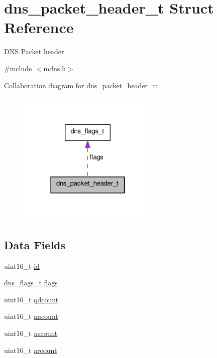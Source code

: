 \hypertarget{structdns__packet__header__t}{\section{dns\-\_\-packet\-\_\-header\-\_\-t Struct Reference}
\label{structdns__packet__header__t}
}


D\-N\-S Packet header.  




{\ttfamily \#include $<$mdns.\-h$>$}



Collaboration diagram for dns\-\_\-packet\-\_\-header\-\_\-t\-:\nopagebreak
\begin{figure}[H]
\begin{center}
\leavevmode
\includegraphics[width=190pt]{structdns__packet__header__t__coll__graph}
\end{center}
\end{figure}
\subsection*{Data Fields}
\begin{DoxyCompactItemize}
\item 
uint16\-\_\-t \hyperlink{structdns__packet__header__t_a4fc3a0c58dfbd1e68224521185cb9384}{id}
\item 
\hyperlink{structdns__flags__t}{dns\-\_\-flags\-\_\-t} \hyperlink{structdns__packet__header__t_a17537773eff778e034c52ba8bc8c2691}{flags}
\item 
uint16\-\_\-t \hyperlink{structdns__packet__header__t_a04016da27d1b8b5859d8527d2742f4f4}{qdcount}
\item 
uint16\-\_\-t \hyperlink{structdns__packet__header__t_a2a5577b198ba758438292038bbab5437}{ancount}
\item 
uint16\-\_\-t \hyperlink{structdns__packet__header__t_aa613b2dc181144b8d4c975a5260d59e3}{nscount}
\item 
uint16\-\_\-t \hyperlink{structdns__packet__header__t_a6eedffaf6f8d915f67e6f6bb77094562}{arcount}
\end{DoxyCompactItemize}


